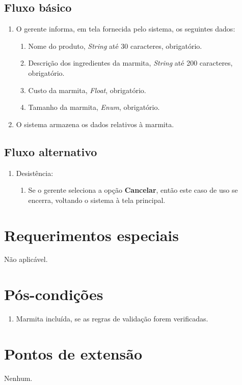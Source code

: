 \subsection{Fluxo básico}

\begin{enumerate}
	\item O gerente informa, em tela fornecida pelo sistema, os seguintes dados:
	\begin{enumerate}
		\item Nome do produto, \emph{String} até 30 caracteres, obrigatório.
		\item Descrição dos ingredientes da marmita, \emph{String} até 200 caracteres, obrigatório.
		\item Custo da marmita, \emph{Float}, obrigatório.
		\item Tamanho da marmita, \emph{Enum}, obrigatório.
	\end{enumerate}
	\item O sistema armazena os dados relativos à marmita.
\end{enumerate}

\subsection{Fluxo alternativo}

\begin{enumerate}
	\item Desistência:
	\begin{enumerate}
		\item Se o gerente seleciona a opção \textbf{Cancelar}, então este caso de uso se encerra, voltando o sistema à tela principal.
	\end{enumerate}
\end{enumerate}

\section{Requerimentos especiais}

Não aplicável.

\section{Pós-condições}

\begin{enumerate}
	\item Marmita incluída, se as regras de validação forem verificadas.
\end{enumerate}

\section{Pontos de extensão}

Nenhum.